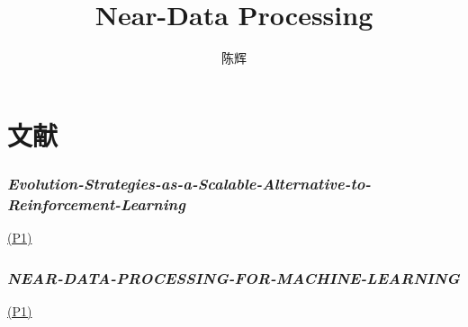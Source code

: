 \documentclass{article}
\title{Near-Data Processing}
\author{陈辉}
\date{}
\newcommand{\paper}[2]{\hyperlink{./papers/#1.pdf.#2}{(P#2)}}
\begin{document}
\maketitle
\tableofcontents
\newpage
\part{文献}
\section{\textit{Evolution-Strategies-as-a-Scalable-Alternative-to-Reinforcement-Learning}}
\paper{Evolution-Strategies-as-a-Scalable-Alternative-to-Reinforcement-Learning}{1}
\section{\textit{NEAR-DATA-PROCESSING-FOR-MACHINE-LEARNING}}
\paper{NEAR-DATA-PROCESSING-FOR-MACHINE-LEARNING}{1}


\end{document}
